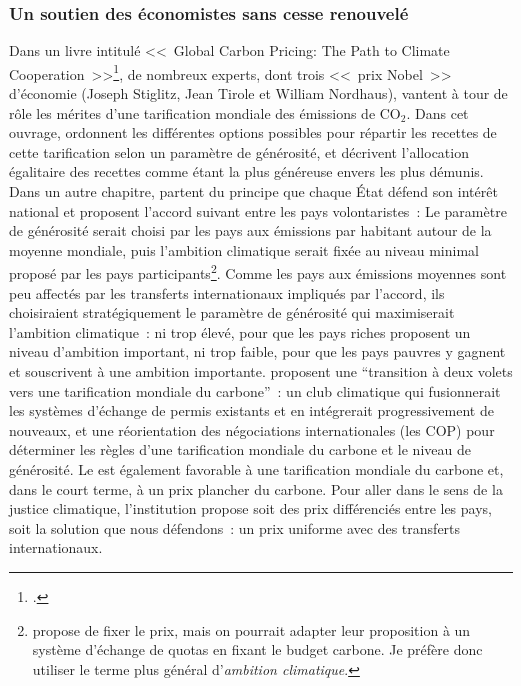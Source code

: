 \documentclass[a5paper,french]{memoir}
\begin{document}
\subsubsection{Un soutien des économistes sans cesse renouvelé}
Dans un livre intitulé <<~Global Carbon Pricing: The Path to Climate Cooperation~>>\footnote{\citet{cramton_global_2017}.}, de nombreux experts, dont trois <<~prix Nobel~>> d'économie (Joseph Stiglitz, Jean Tirole et William Nordhaus), vantent à tour de rôle les mérites d'une tarification mondiale des émissions de CO$_\text{2}$. Dans cet ouvrage, \citet{gollier_negotiating_2015} ordonnent les différentes options possibles pour répartir les recettes de cette tarification selon un paramètre de générosité, et décrivent l'allocation égalitaire des recettes comme étant la plus généreuse envers les plus démunis. %
Dans un autre chapitre, \citet{cramton_international_2015} partent du principe que chaque État défend son intérêt national et proposent l'accord suivant entre les pays %
volontaristes~: Le paramètre de générosité serait choisi par les pays aux émissions par habitant autour de la moyenne mondiale, puis l'ambition climatique serait fixée au niveau minimal proposé par les pays participants\footnote{\citet{cramton_international_2015} propose de fixer le prix, mais on pourrait adapter leur proposition à un système d'échange de quotas en fixant le budget carbone. Je préfère donc utiliser le terme plus général d'\textit{ambition climatique}.}. Comme les pays aux émissions moyennes sont peu affectés par les transferts internationaux impliqués par l'accord, ils choisiraient stratégiquement le paramètre de générosité qui maximiserait l'ambition climatique~: ni trop élevé, pour que les pays riches proposent un niveau d'ambition important, ni trop faible, pour que les pays pauvres y gagnent et souscrivent à une ambition importante. \citet{van_den_berg_implications_2020} proposent une ``transition à deux volets vers une tarification mondiale du carbone''~: un club climatique qui fusionnerait les systèmes d'échange de permis existants et en intégrerait progressivement de nouveaux, et une réorientation des négociations internationales (les COP) pour déterminer les règles d'une tarification mondiale du carbone et le niveau de générosité. Le \citet{imf_how_2019} est également favorable à une tarification mondiale du carbone et, dans le court terme, à un prix plancher du carbone. Pour aller dans le sens de la justice climatique, l'institution propose soit des prix différenciés entre les pays, soit la solution que nous défendons~: un prix uniforme avec des transferts internationaux. 
\end{document}
